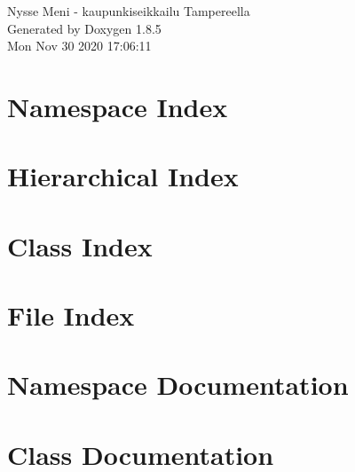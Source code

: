 \documentclass[twoside]{book}
\newcommand{\clearemptydoublepage}{%
  \newpage{\pagestyle{empty}\cleardoublepage}%
}
\begin{document}
\hypersetup{pageanchor=false}
\begin{titlepage}
\vspace*{7cm}
\begin{center}%
{\Large Nysse Meni -\/ kaupunkiseikkailu Tampereella }\\
\vspace*{1cm}
{\large Generated by Doxygen 1.8.5}\\
\vspace*{0.5cm}
{\small Mon Nov 30 2020 17:06:11}\\
\end{center}
\end{titlepage}
\clearemptydoublepage
\tableofcontents
\clearemptydoublepage
{}
\hypersetup{pageanchor=true}

\chapter{Namespace Index}

\chapter{Hierarchical Index}

\chapter{Class Index}

\chapter{File Index}

\chapter{Namespace Documentation}


\chapter{Class Documentation}

















\end{document}
